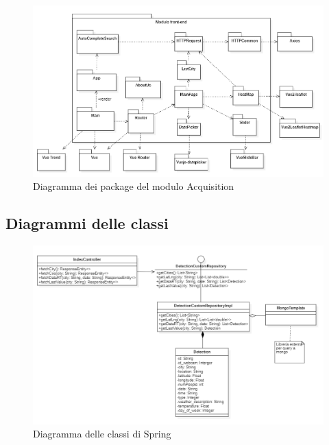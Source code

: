 \begin{figure}[H]
  \begin{center}
    \includegraphics[scale=0.65]{../immagini/diag_PB/diag_pack_vue.png}
    \caption{Diagramma dei package del modulo Acquisition}
  \end{center}
\end{figure}

\subsection{Diagrammi delle classi}\label{ArchitetturaModuloWebAppDiagrammiDelleClassi}
\begin{figure}[H]
  \begin{center}
    \includegraphics[scale=0.6]{../immagini/diag_PB/diag_class_spring.png}
    \caption{Diagramma delle classi di Spring}
  \end{center}
\end{figure}

